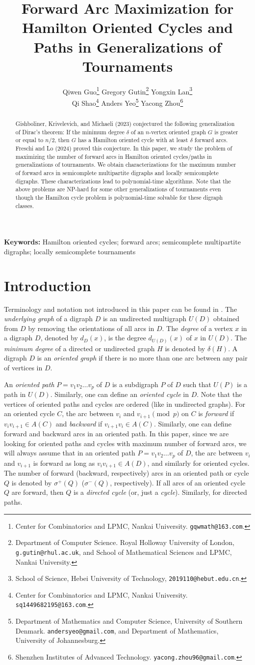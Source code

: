 \documentclass{article}
\title{Forward Arc Maximization for Hamilton Oriented Cycles and Paths in Generalizations of Tournaments}
\author{Qiwen Guo\thanks{Center for Combinatorics and LPMC, Nankai University. {\tt gqwmath@163.com}.}
\hspace{2mm}
Gregory Gutin\thanks{Department of Computer Science. Royal Holloway University of London, {\tt g.gutin@rhul.ac.uk}, and School of Mathematical Sciences and LPMC, Nankai University.}
\hspace{2mm} Yongxin Lan\thanks{School of Science, Hebei University of Technology, {\tt  2019110@hebut.edu.cn}.}
\\ Qi Shao\thanks{Center for Combinatorics and LPMC, Nankai University. {\tt sq1449682195@163.com}.}
\hspace{2mm} Anders Yeo\thanks{Department of Mathematics and Computer Science, University of Southern Denmark. {\tt andersyeo@gmail.com}, and Department of Mathematics, University of Johannesburg.}
\hspace{2mm} Yacong Zhou\thanks{Shenzhen Institutes of Advanced Technology. {\tt yacong.zhou96@gmail.com}.}}
\newcommand{\GGnn}[1]{{#1}}
\newcommand{\2}{\vspace{0.2cm}}
\begin{document}
\maketitle
\begin{abstract}
Gishboliner, Krivelevich, and Michaeli (2023) conjectured the following generalization of Dirac's theorem: If the minimum degree $\delta$ of an $n$-vertex oriented graph $G$ is greater or equal to $n/2$, then $G$ has a Hamilton oriented cycle with at least $\delta$ forward arcs. Freschi and Lo (2024) proved this conjecture. In this paper, we study the problem of maximizing the number of forward arcs in Hamilton oriented cycles/paths in generalizations of tournaments. We obtain characterizations for the maximum number of forward arcs in semicomplete multipartite digraphs and locally semicomplete digraphs. These characterizations lead to polynomial-time algorithms. Note that the above problems are NP-hard for some other generalizations of tournaments \GGnn{even though the Hamilton cycle problem is polynomial-time solvable for these digraph classes}. 
\end{abstract}

\noindent\textbf{Keywords:} Hamilton oriented cycles; forward arcs; semicomplete multipartite digraphs; locally semicomplete tournaments
\section{Introduction}

Terminology and notation not introduced in this paper can be found in \cite{BG00, BG18, BM08}. The {\em underlying graph} of a digraph $D$ is an undirected multigraph $U(D)$ obtained from $D$ by removing the orientations of all arcs in $D$. The {\em degree} of a vertex $x$ in a digraph $D$, denoted by $d_D(x)$, is the degree $d_{U(D)}(x)$ of $x$ in $U(D)$. The \emph{minimum degree} of a directed or undirected graph $H$ is denoted by $\delta(H)$. A digraph $D$ is an {\em oriented graph} if there is no more than one arc between any pair of vertices in $D$.  

\GGnn{An {\em oriented path} $P=v_1v_2\dots v_p$ of $D$ is a subdigraph $P$ of $D$ such that $U(P)$ is a path in $U(D)$. Similarly, one can define an {\em oriented cycle} in $D$. Note that the vertices of oriented paths and cycles are ordered (like in undirected graphs).} For an oriented cycle $C$, the arc between $v_i$ and $v_{i+1} \pmod{p}$ on $C$ is \emph{forward} if $v_iv_{i+1}\in A(C)$ and  \emph{backward} if $v_{i+1}v_{i}\in A(C)$. \GGnn{Similarly, one can define forward and backward arcs in an oriented path. In this paper, since we are looking for oriented paths and cycles with maximum number of forward arcs, we will always assume that in an oriented path $P=v_1v_2\dots v_p$ of $D$, the arc between $v_i$ and $v_{i+1}$ is forward as long as $v_iv_{i+1}\in A(D)$, and similarly for oriented cycles. The number of forward (backward, respectively) arcs in an oriented path or cycle $Q$ is denoted by $\sigma^+(Q)$ ($\sigma^-(Q)$, respectively). If all arcs of an oriented cycle $Q$ are forward, then $Q$ is a {\em directed cycle} (or, just a {\em cycle}).
Similarly, for directed paths. }
\end{document}
